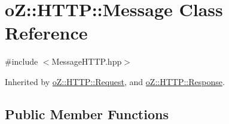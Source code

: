 \hypertarget{classo_z_1_1_h_t_t_p_1_1_message}{}\section{oZ\+::H\+T\+TP\+::Message Class Reference}
\label{classo_z_1_1_h_t_t_p_1_1_message}


{\ttfamily \#include $<$Message\+H\+T\+T\+P.\+hpp$>$}



Inherited by \mbox{\hyperlink{classo_z_1_1_h_t_t_p_1_1_request}{o\+Z\+::\+H\+T\+T\+P\+::\+Request}}, and \mbox{\hyperlink{classo_z_1_1_h_t_t_p_1_1_response}{o\+Z\+::\+H\+T\+T\+P\+::\+Response}}.

\subsection*{Public Member Functions}
